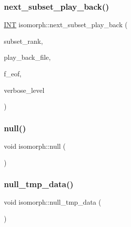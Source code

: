 \mbox{\label{classisomorph_afd05a10153c30593750a6ca7812682d2}} 
\subsubsection{\texorpdfstring{next\+\_\+subset\+\_\+play\+\_\+back()}{next\_subset\_play\_back()}}
{\footnotesize\ttfamily \mbox{\hyperlink{galois_8h_a09fddde158a3a20bd2dcadb609de11dc}{I\+NT}} isomorph\+::next\+\_\+subset\+\_\+play\+\_\+back (\begin{DoxyParamCaption}\item[{\mbox{\hyperlink{galois_8h_a09fddde158a3a20bd2dcadb609de11dc}{I\+NT}} \&}]{subset\+\_\+rank,  }\item[{ifstream $\ast$}]{play\+\_\+back\+\_\+file,  }\item[{\mbox{\hyperlink{galois_8h_a09fddde158a3a20bd2dcadb609de11dc}{I\+NT}} \&}]{f\+\_\+eof,  }\item[{\mbox{\hyperlink{galois_8h_a09fddde158a3a20bd2dcadb609de11dc}{I\+NT}}}]{verbose\+\_\+level }\end{DoxyParamCaption})}

\mbox{\label{classisomorph_a8212fe560851abbc45a12b866694e321}} 
\subsubsection{\texorpdfstring{null()}{null()}}
{\footnotesize\ttfamily void isomorph\+::null (\begin{DoxyParamCaption}{ }\end{DoxyParamCaption})}

\mbox{\label{classisomorph_a169534be12152d9c663bb85fb422951c}} 
\subsubsection{\texorpdfstring{null\+\_\+tmp\+\_\+data()}{null\_tmp\_data()}}
{\footnotesize\ttfamily void isomorph\+::null\+\_\+tmp\+\_\+data (\begin{DoxyParamCaption}{ }\end{DoxyParamCaption})}

